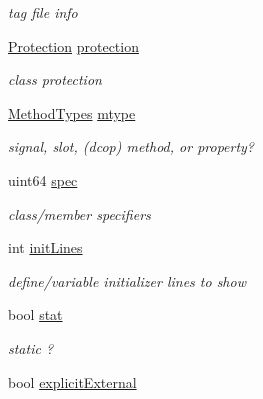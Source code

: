 \begin{DoxyCompactItemize}
\begin{DoxyCompactList}\small\item\em tag file info \end{DoxyCompactList}\item 
\hypertarget{class_entry_aaadb86b22caf2b07f0b45b35bfdbe25f}{\hyperlink{types_8h_a90e352184df58cd09455fe9996cd4ded}{Protection} \hyperlink{class_entry_aaadb86b22caf2b07f0b45b35bfdbe25f}{protection}}\label{class_entry_aaadb86b22caf2b07f0b45b35bfdbe25f}

\begin{DoxyCompactList}\small\item\em class protection \end{DoxyCompactList}\item 
\hypertarget{class_entry_a33ee87c9268990e6e381e2b622a3a330}{\hyperlink{types_8h_a0872178db42722c310fe6117189ed441}{Method\-Types} \hyperlink{class_entry_a33ee87c9268990e6e381e2b622a3a330}{mtype}}\label{class_entry_a33ee87c9268990e6e381e2b622a3a330}

\begin{DoxyCompactList}\small\item\em signal, slot, (dcop) method, or property? \end{DoxyCompactList}\item 
\hypertarget{class_entry_ab185cff582e0684a926b4da23bca207d}{uint64 \hyperlink{class_entry_ab185cff582e0684a926b4da23bca207d}{spec}}\label{class_entry_ab185cff582e0684a926b4da23bca207d}

\begin{DoxyCompactList}\small\item\em class/member specifiers \end{DoxyCompactList}\item 
\hypertarget{class_entry_ace9aa92b66f9f1477ec56188a77416ee}{int \hyperlink{class_entry_ace9aa92b66f9f1477ec56188a77416ee}{init\-Lines}}\label{class_entry_ace9aa92b66f9f1477ec56188a77416ee}

\begin{DoxyCompactList}\small\item\em define/variable initializer lines to show \end{DoxyCompactList}\item 
\hypertarget{class_entry_a56b4ed32e2ef0fbae76b125d7ad98acd}{bool \hyperlink{class_entry_a56b4ed32e2ef0fbae76b125d7ad98acd}{stat}}\label{class_entry_a56b4ed32e2ef0fbae76b125d7ad98acd}

\begin{DoxyCompactList}\small\item\em static ? \end{DoxyCompactList}\item 
\hypertarget{class_entry_aff7273087cbd5150e8a1d35121b767b5}{bool \hyperlink{class_entry_aff7273087cbd5150e8a1d35121b767b5}{explicit\-External}}\label{class_entry_aff7273087cbd5150e8a1d35121b767b5}


\end{DoxyCompactItemize}
